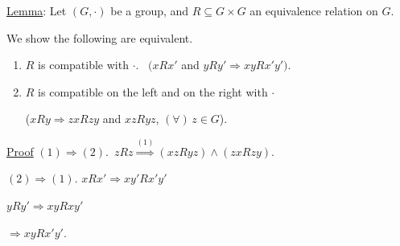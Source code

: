 \documentclass[12pt]{article}
\begin{document}
\bigskip
\noindent\underline{Lemma}: Let $(G,\cdot)$ be a group, and $R\subseteq G\times G$ an equivalence relation on $G$.

\noindent We show the following are equivalent.

\begin{enumerate}
\item[(1)] $R$ is compatible with $\cdot$. \ $\big(xRx'$ and $yRy' \Rightarrow xyRx'y'\big)$.
\item[(2)] $R$ is compatible on the left and on the right with $\cdot$

\noindent \big($xRy \Rightarrow zxRzy$ and $xzRyz$, $(\forall)\,z\in G$\big).
\end{enumerate}

\bigskip
\noindent\underline{Proof} $(1)\Rightarrow(2)$.\ $zRz \overset{(1)}{\Longrightarrow} (xzRyz)\wedge(zxRzy)$.

\bigskip
\noindent $(2) \Rightarrow (1)$. \quad $xRx' \Rightarrow xy'Rx'y'$

\noindent $yRy' \Rightarrow xyRxy'$

\noindent $\Rightarrow xyRx'y'$.
\end{document}
